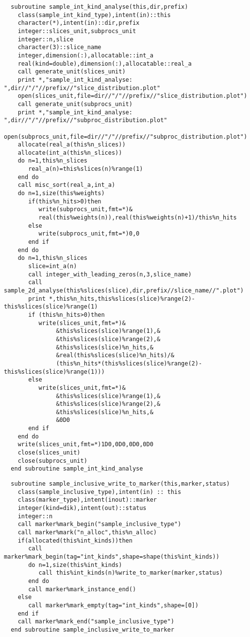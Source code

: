 \begin{Verbatim}
  subroutine sample_int_kind_analyse(this,dir,prefix)
    class(sample_int_kind_type),intent(in)::this
    character(*),intent(in)::dir,prefix
    integer::slices_unit,subprocs_unit
    integer::n,slice
    character(3)::slice_name
    integer,dimension(:),allocatable::int_a
    real(kind=double),dimension(:),allocatable::real_a
    call generate_unit(slices_unit)
    print *,"sample_int_kind_analyse: ",dir//"/"//prefix//"slice_distribution.plot"
    open(slices_unit,file=dir//"/"//prefix//"slice_distribution.plot")
    call generate_unit(subprocs_unit)
    print *,"sample_int_kind_analyse: ",dir//"/"//prefix//"subproc_distribution.plot"
    open(subprocs_unit,file=dir//"/"//prefix//"subproc_distribution.plot")
    allocate(real_a(this%n_slices))
    allocate(int_a(this%n_slices))
    do n=1,this%n_slices
       real_a(n)=this%slices(n)%range(1)
    end do
    call misc_sort(real_a,int_a)
    do n=1,size(this%weights)
       if(this%n_hits>0)then
          write(subprocs_unit,fmt=*)&
          real(this%weights(n)),real(this%weights(n)+1)/this%n_hits
       else
          write(subprocs_unit,fmt=*)0,0
       end if
    end do
    do n=1,this%n_slices       
       slice=int_a(n)
       call integer_with_leading_zeros(n,3,slice_name)
       call sample_2d_analyse(this%slices(slice),dir,prefix//slice_name//".plot")  
       print *,this%n_hits,this%slices(slice)%range(2)-this%slices(slice)%range(1)
       if (this%n_hits>0)then
          write(slices_unit,fmt=*)&
               &this%slices(slice)%range(1),&
               &this%slices(slice)%range(2),&
               &this%slices(slice)%n_hits,&
               &real(this%slices(slice)%n_hits)/&
               (this%n_hits*(this%slices(slice)%range(2)-this%slices(slice)%range(1)))
       else
          write(slices_unit,fmt=*)&
               &this%slices(slice)%range(1),&
               &this%slices(slice)%range(2),&
               &this%slices(slice)%n_hits,&
               &0D0
       end if
    end do
    write(slices_unit,fmt=*)1D0,0D0,0D0,0D0
    close(slices_unit)
    close(subprocs_unit)
  end subroutine sample_int_kind_analyse
\end{Verbatim}

\begin{Verbatim}
  subroutine sample_inclusive_write_to_marker(this,marker,status)
    class(sample_inclusive_type),intent(in) :: this
    class(marker_type),intent(inout)::marker
    integer(kind=dik),intent(out)::status
    integer::n
    call marker%mark_begin("sample_inclusive_type")
    call marker%mark("n_alloc",this%n_alloc)
    if(allocated(this%int_kinds))then
       call marker%mark_begin(tag="int_kinds",shape=shape(this%int_kinds))
       do n=1,size(this%int_kinds)
          call this%int_kinds(n)%write_to_marker(marker,status)
       end do
       call marker%mark_instance_end()
    else
       call marker%mark_empty(tag="int_kinds",shape=[0])
    end if
    call marker%mark_end("sample_inclusive_type")
  end subroutine sample_inclusive_write_to_marker
\end{Verbatim}

